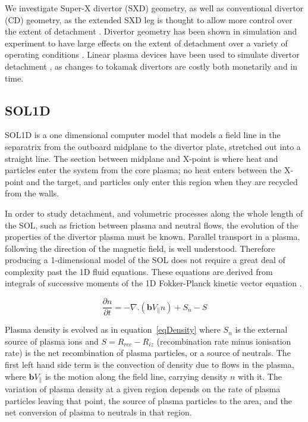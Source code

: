 \documentclass[12pt]{article}  %
\begin{document}
We investigate Super-X divertor (SXD) geometry, as well as conventional divertor (CD) geometry, as the extended SXD leg is thought to allow more control over the extent of detachment \cite{Valanju2009}. Divertor geometry has been shown in simulation and experiment to have large effects on the extent of detachment over a variety of operating conditions \cite{Pitts2001}. Linear plasma devices have been used to simulate divertor detachment \cite{Nishijima2002, Ohno2002}, as changes to tokamak divertors are costly both monetarily and in time.

\subsection{SOL1D}\label{ssecSOL1D}
SOL1D is a one dimensional computer model that models a field line in the separatrix from the outboard midplane to the divertor plate, stretched out into a straight line. The section between midplane and X-point is where heat and particles enter the system from the core plasma; no heat enters between the X-point and the target, and particles only enter this region when they are recycled from the walls.

In order to study detachment, and volumetric processes along the whole length of the SOL, such as friction between plasma and neutral flows, the evolution of the properties of the divertor plasma must be known. Parallel transport in a plasma, following the direction of the magnetic field, is well understood. Therefore producing a 1-dimensional model of the SOL does not require a great deal of complexity past the 1D fluid equations. These equations are derived from integrals of successive moments of the 1D Fokker-Planck kinetic vector equation \cite{Stangeby}.

  \begin{equation}\label{eqDensity}
  \frac{\partial n}{\partial t} = -\nabla . (\textbf{b}V_{\parallel}n) + S_n - S
  \end{equation}

Plasma density is evolved as in equation~\ref{eqDensity} where $S_n$ is the external source of plasma ions and $S=R_{rec} - R_{iz}$ (recombination rate minus ionisation rate) is the net recombination of plasma particles, or a source of neutrals. The first left hand side term is the convection of density due to flows in the plasma, where $\textbf{b}V_{\parallel}$ is the motion along the field line, carrying density $n$ with it. The variation of plasma density at a given region depends on the rate of plasma particles leaving that point, the source of plasma particles to the area, and the net conversion of plasma to neutrals in that region.
\end{document}
